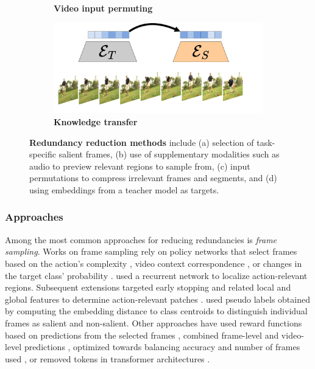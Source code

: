 \begin{figure}[t]
\begin{subfigure}[b]{0.49\linewidth}
         \caption{\textbf{Video input permuting}}
         \label{fig:redundancies_reduction::permute}
     \end{subfigure}
     \hfill
     \begin{subfigure}[b]{0.49\linewidth}
         \centering
         \includegraphics[width=\linewidth]{figs/redundancies_reduction/redudancies_transfer.pdf}
         \caption{\textbf{Knowledge transfer}}
         \label{fig:redundancies_reduction::transfer}
     \end{subfigure}
        \caption{\textbf{Redundancy reduction methods} include (a) selection of task-specific salient frames, (b) use of supplementary modalities such as audio to preview relevant regions to sample from, (c) input permutations to compress irrelevant frames and segments, and (d) using embeddings from a teacher model as targets.}
        \label{fig:redundancies_reduction}
\end{figure}



\subsubsection{Approaches}
\label{sec:recognition::approaches}

Among the most common approaches for reducing redundancies is \emph{frame sampling}. Works on frame sampling rely on policy networks that select frames based on the action's complexity , video context correspondence , or changes in the target class' probability .  used a recurrent network to localize action-relevant regions. Subsequent extensions targeted early stopping  and related local and global features to determine action-relevant patches .  used pseudo labels obtained by computing the embedding distance to class centroids to distinguish individual frames as salient and non-salient. Other approaches have used reward functions based on predictions from the selected frames , combined frame-level and video-level predictions , optimized towards balancing accuracy and number of frames used , or removed tokens in transformer architectures . 

